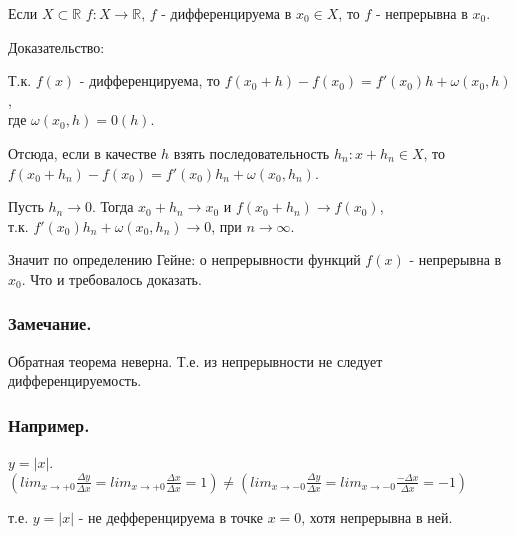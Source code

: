 \begin{teorema}

Если $X \subset \mathbb {R}$ $f : X \rightarrow \mathbb {R}$, $f$ - дифференцируема в $x_0 \in X$, то $f$ - непрерывна в $x_0$.

\end{teorema}

Доказательство:

Т.к. $f(x)$ - дифференцируема, то $f(x_0 +h) - f(x_0) = f'(x_0)h + \omega(x_0,h)$,
\\
где $\omega(x_0,h) = 0(h)$.

Отсюда, если в качестве $h$ взять последовательность $h_n : x + h_n \in X$, то 
\\
$f(x_0 +h_n) - f(x_0) = f'(x_0)h_n + \omega(x_0,h_n)$.

Пусть $h_n \rightarrow 0$. Тогда $x_0 +h_n \rightarrow x_0$ и  $f(x_0 + h_n) \rightarrow f(x_0)$,
\\
т.к. $f'(x_0)h_n + \omega(x_0,h_n) \rightarrow 0$, при $n \rightarrow \infty$.

Значит по определению Гейне: о непрерывности функций $f(x)$ - непрерывна в $x_0$. Что и требовалось доказать.

\subsubsection{Замечание.}

Обратная теорема неверна. Т.е. из непрерывности не следует дифференцируемость.

\subsubsection{Например.}

$y = |x|$.
\\
$(lim_{x \to +0} \frac {\Delta y}{\Delta x} = lim_{x \to +0} \frac {\Delta x}{\Delta x} = 1) \neq (lim_{x \to -0} \frac {\Delta y}{\Delta x} = lim_{x \to -0} \frac {-\Delta x}{\Delta x} = -1)$

т.е. $y = |x|$ - не дефференцируема в точке $x=0$, хотя непрерывна в ней.
